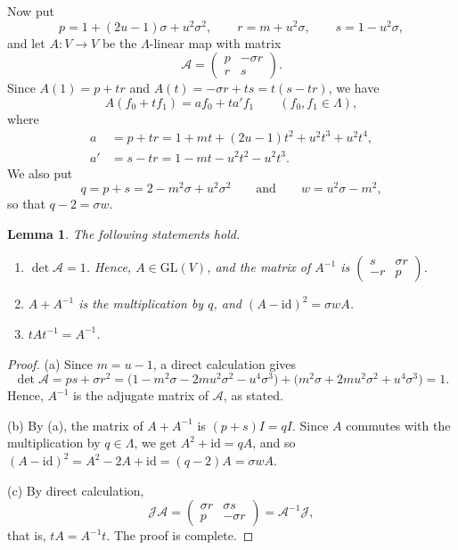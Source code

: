 \documentclass[11pt,reqno,a4paper]{amsart}
\numberwithin{equation}{section}
\newtheorem{lemma}[theorem]{Lemma}
\theoremstyle{definition}
\theoremstyle{plain}
\newcommand{\GL}{\mathrm{GL}}
\newcommand{\id}{\mathrm{id}}
\newcommand{\Acal}{\mathcal A}
\newcommand{\Jcal}{\mathcal J}
\begin{document}
Now put
\[
p=1+(2u-1)\sigma+u^2\sigma^2,\qquad r=m+u^2\sigma,\qquad s=1-u^2\sigma,
\]
and let $A:V\to V$ be the $\Lambda$-linear map with matrix
\[
\Acal=\begin{pmatrix}p&-\sigma r\\r&s\end{pmatrix}.
\]
Since $A(1)=p+tr$ and $A(t)=-\sigma r+ts=t(s-tr)$, we have
\begin{equation}\label{eq:Aaction}
A(f_0+tf_1)=af_0+ta'f_1\qquad(f_0,f_1\in\Lambda),
\end{equation}
where
\[
\begin{aligned}
a&=p+tr=1+mt+(2u-1)t^2+u^2t^3+u^2t^4,\\
a'&=s-tr=1-mt-u^2t^2-u^2t^3.
\end{aligned}
\]
We also put
\[
q=p+s=2-m^2\sigma+u^2\sigma^2\qquad\text{and}\qquad w=u^2\sigma-m^2,
\]
so that $q-2=\sigma w$.

\begin{lemma}
The following statements hold.
\begin{enumerate}
\item[(a)] $\det\Acal=1$. Hence, $A\in\GL(V)$, and the matrix of $A^{-1}$ is $\begin{pmatrix}s&\sigma r\\-r&p\end{pmatrix}$.
\item[(b)] $A+A^{-1}$ is the multiplication by $q$, and $(A-\id)^2=\sigma w A$.
\item[(c)] $tAt^{-1}=A^{-1}$.
\end{enumerate}
\end{lemma}
\begin{proof}
(a) Since $m=u-1$, a direct calculation gives
\[
\det\Acal=ps+\sigma r^2
=\bigl(1-m^2\sigma-2mu^2\sigma^2-u^4\sigma^3\bigr)
 +\bigl(m^2\sigma+2mu^2\sigma^2+u^4\sigma^3\bigr)=1.
\]
Hence, $A^{-1}$ is the adjugate matrix of $\Acal$, as stated.

(b) By (a), the matrix of $A+A^{-1}$ is $(p+s)I=qI$. Since $A$ commutes with the multiplication by $q\in\Lambda$, we get $A^2+\id=qA$, and so $(A-\id)^2=A^2-2A+\id=(q-2)A=\sigma wA$.

(c) By direct calculation,
\[
\Jcal\Acal=\begin{pmatrix}\sigma r&\sigma s\\p&-\sigma r\end{pmatrix}=\Acal^{-1}\Jcal,
\]
that is, $tA=A^{-1}t$. The proof is complete.
\end{proof}
\end{document}
